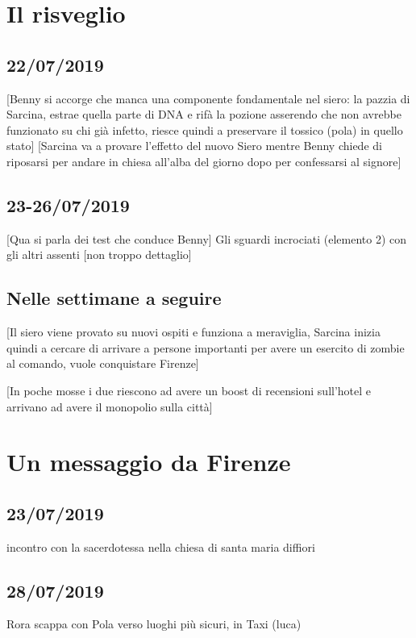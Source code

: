 \section{Il risveglio}
\subsection*{22/07/2019}
[Benny si accorge che manca una componente fondamentale nel siero: la pazzia di Sarcina, estrae quella parte di DNA e rifà la pozione asserendo che non avrebbe funzionato su chi già infetto, riesce quindi a preservare il tossico (pola) in quello stato] 
[Sarcina va a provare l'effetto del nuovo Siero mentre Benny chiede di riposarsi per andare in chiesa all'alba del giorno dopo per confessarsi al signore]


\subsection*{23-26/07/2019}
[Qua si parla dei test che conduce Benny]
Gli sguardi incrociati (elemento 2) con gli altri assenti [non troppo dettaglio]


\subsection*{Nelle settimane a seguire}
[Il siero viene provato su nuovi ospiti e funziona a meraviglia, Sarcina inizia quindi a cercare di arrivare a persone importanti per avere un esercito di zombie al comando, vuole conquistare Firenze]

[In poche mosse i due riescono ad avere un boost di recensioni sull'hotel e arrivano ad avere il monopolio sulla città]


\section{Un messaggio da Firenze}

\subsection*{23/07/2019}

incontro con la sacerdotessa nella chiesa di santa maria diffiori

\subsection*{28/07/2019}

Rora scappa con Pola verso luoghi più sicuri, in Taxi (luca)
